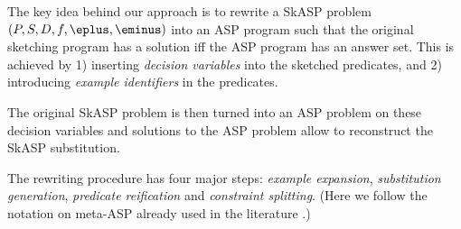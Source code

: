 The key idea behind our approach is to rewrite a SkASP problem $(P,S,D,f,\eplus,\eminus)$ into an ASP program such that the original sketching program has a solution iff the ASP program has an answer set. 
This is achieved by 1) inserting \textit{decision variables} into the sketched predicates,
and 2) introducing {\em example identifiers} in the predicates. 

The original SkASP problem is then turned into an ASP problem  
on these decision variables and solutions to the ASP problem allow to reconstruct the SkASP substitution.


The rewriting procedure has four major steps: \textit{example expansion}, \textit{substitution generation}, \textit{predicate reification} and \textit{constraint splitting}. (Here we follow the notation on meta-ASP already used in the literature \parencite{inductive_asp,asp_meta}.) 

